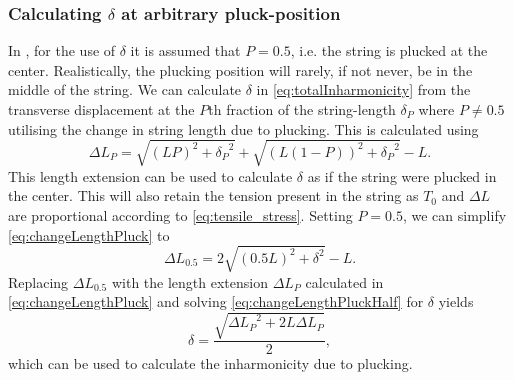 \documentclass{article}
\begin{document}
\begin{sloppy}
\subsubsection{Calculating $\delta$ at arbitrary pluck-position}
In \cite{rossing:science_of_string_instruments}, for the use of $\delta$ it is assumed that $P=0.5$, i.e. the string is plucked at the center. Realistically, the plucking position will rarely, if not never, be in the middle of the string. We can calculate $\delta$ in \eqref{eq:totalInharmonicity} from the transverse displacement at the $P$th fraction of the string-length $\delta_P$ where $P \neq 0.5$ utilising the change in string length due to plucking. This is calculated using
\begin{equation}\label{eq:changeLengthPluck}
    \Delta L_P = \sqrt{(LP)^2+{\delta_P}^2}+\sqrt{(L(1-P))^2+{\delta_P}^2} - L.
\end{equation}
This length extension can be used to calculate $\delta$ as if the string were plucked in the center. This will also retain the tension present in the string as $T_0$ and $\Delta L$ are proportional according to \eqref{eq:tensile_stress}. Setting $P = 0.5$, we can simplify \eqref{eq:changeLengthPluck} to
%
\begin{equation}\label{eq:changeLengthPluckHalf}
    \Delta L_{0.5} = 2\sqrt{(0.5L)^2 + \delta^2} - L.
\end{equation}
%
Replacing $\Delta L_{0.5}$ with the length extension $\Delta L_P$ calculated in \eqref{eq:changeLengthPluck} and solving \eqref{eq:changeLengthPluckHalf} for $\delta$ yields
\begin{equation}
    \delta = \frac{\sqrt{{\Delta L_P}^2+2L\Delta L_P}}{2},
\end{equation}
which can be used to calculate the inharmonicity due to plucking.


\end{sloppy}
\end{document}
